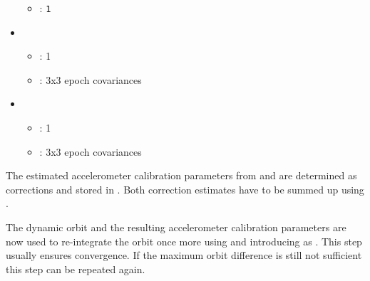 \begin{itemize}
\begin{itemize}
            \item {}: \verb|1|
        \end{itemize}
    \item {}
        \begin{itemize}
            \item {}: 1
            \item {}: 3x3 epoch covariances
        \end{itemize}
    \item {}
        \begin{itemize}
            \item {}: 1
            \item {}: 3x3 epoch covariances
        \end{itemize}
\end{itemize}
The estimated accelerometer calibration parameters from 
and  are determined as corrections and stored
in . Both correction estimates have to be summed up using
.

The dynamic orbit and the resulting accelerometer calibration parameters are now used to re-integrate
the orbit once more using  and introducing
 as .
This step usually ensures convergence. If the maximum orbit difference is still not sufficient this step
can be repeated again.

